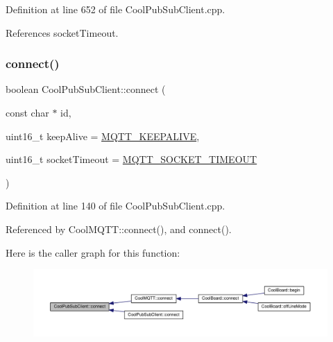 Definition at line 652 of file Cool\+Pub\+Sub\+Client.\+cpp.



References socket\+Timeout.

\mbox{\label{class_cool_pub_sub_client_a2664c2ebc302b2fa49f493a339ecc891}} 
\subsubsection{\texorpdfstring{connect()}{connect()}\hspace{0.1cm}{\footnotesize\ttfamily [1/4]}}
{\footnotesize\ttfamily boolean Cool\+Pub\+Sub\+Client\+::connect (\begin{DoxyParamCaption}\item[{const char $\ast$}]{id,  }\item[{uint16\+\_\+t}]{keep\+Alive = {\ttfamily \hyperlink{_cool_pub_sub_client_8h_afb4dd8c75385ab30e659314df7c2c335}{M\+Q\+T\+T\+\_\+\+K\+E\+E\+P\+A\+L\+I\+VE}},  }\item[{uint16\+\_\+t}]{socket\+Timeout = {\ttfamily \hyperlink{_cool_pub_sub_client_8h_a092cc564e4d7f03fdab6137e30a7f05b}{M\+Q\+T\+T\+\_\+\+S\+O\+C\+K\+E\+T\+\_\+\+T\+I\+M\+E\+O\+UT}} }\end{DoxyParamCaption})}



Definition at line 140 of file Cool\+Pub\+Sub\+Client.\+cpp.



Referenced by Cool\+M\+Q\+T\+T\+::connect(), and connect().

Here is the caller graph for this function\+:\nopagebreak
\begin{figure}[H]
\begin{center}
\leavevmode
\includegraphics[width=350pt]{d8/d4b/class_cool_pub_sub_client_a2664c2ebc302b2fa49f493a339ecc891_icgraph}
\end{center}
\end{figure}
\mbox{\label{class_cool_pub_sub_client_a7f30e39bf4ca5ea5fb9747c403639a03}} 
